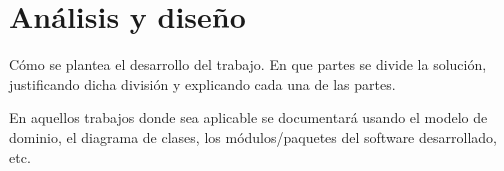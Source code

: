 \chapter{An\'{a}lisis y dise\~{n}o}
Cómo se plantea el desarrollo del trabajo. En que partes se 
divide la solución, justificando dicha división y explicando 
cada una de las partes.

En aquellos trabajos donde sea aplicable se documentará 
usando el modelo de dominio, el diagrama de clases, los 
módulos/paquetes del software desarrollado, etc.